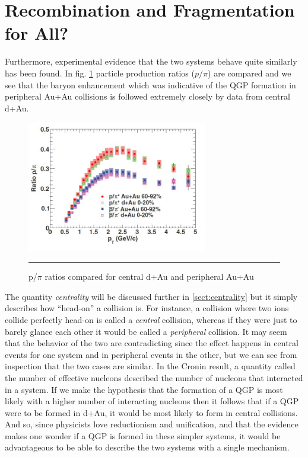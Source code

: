 \section{Recombination and Fragmentation for All?}
\label{sect:recombcold}
Furthermore, experimental evidence that the two systems behave quite similarly has been found. In fig. \ref{fig:daaaratios} particle production ratios ($p/\pi$) are compared and we see that the baryon enhancement which was indicative of the QGP formation in peripheral Au+Au collisions is followed extremely closely by data from central d+Au. 

\begin{figure}[htbp!]
  \centering
    \includegraphics[width=0.7\textwidth]{prevplots/dAvsAAratios.JPG}
    \rule{35em}{0.5pt}
  \caption[p/$\pi$ ratios compared for central d+Au and peripheral Au+Au]{p/$\pi$ ratios compared for central d+Au and peripheral Au+Au\citep{PhysRevC.88.024906}}
  \label{fig:daaaratios}
\end{figure} 

The quantity \textit{centrality} will be discussed further in \ref{sect:centrality} but it simply describes how ``head-on'' a collision is. For instance, a collision where two ions collide perfectly head-on is called a \textit{central} collision, whereas if they were just to barely glance each other it would be called a \textit{peripheral} collision. It may seem that the behavior of the two are contradicting since the effect happens in central events for one system and in peripheral events in the other, but we can see from inspection that the two cases are similar. In the Cronin result, a quantity called the number of effective nucleons described the number of nucleons that interacted in a system. If we make the hypothesis that the formation of a QGP is most likely with a higher number of interacting nucleons then it follows that if a QGP were to be formed in d+Au, it would be most likely to form in central collisions. And so, since physicists love reductionism and unification, and that the evidence makes one wonder if a QGP is formed in these simpler systems, it would be advantageous to be able to describe the two systems with a single mechanism.

